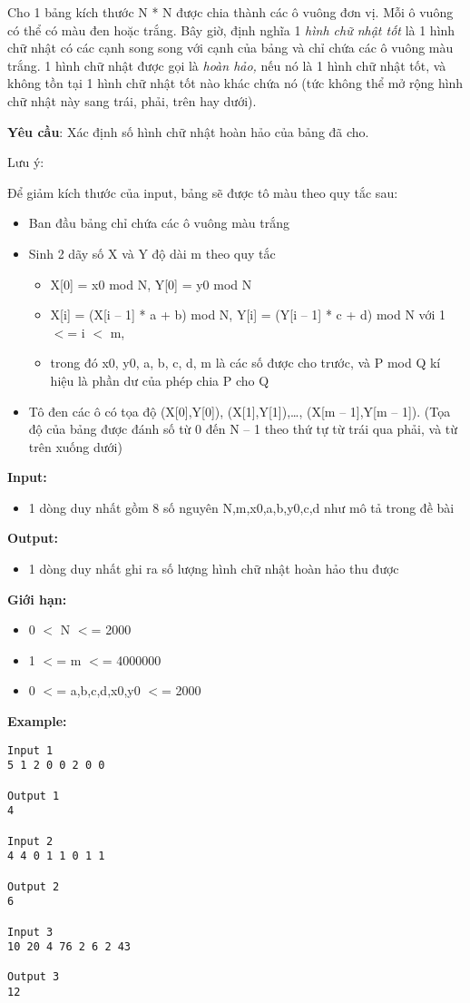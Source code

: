 

Cho 1 bảng kích thước N * N được chia thành các ô vuông đơn vị. Mỗi ô vuông có thể có màu đen hoặc trắng. Bây giờ, định nghĩa 1 \emph{ hình chữ nhật tốt } là 1 hình chữ nhật có các cạnh song song với cạnh của bảng và chỉ chứa các ô vuông màu trắng. 1 hình chữ nhật được gọi là \emph{ hoàn hảo, } nếu nó là 1 hình chữ nhật tốt, và không tồn tại 1 hình chữ nhật tốt nào khác chứa nó (tức không thể mở rộng hình chữ nhật này sang trái, phải, trên hay dưới).

\textbf{Yêu cầu}: Xác định số hình chữ nhật hoàn hảo của bảng đã cho.

Lưu ý:

Để giảm kích thước của input, bảng sẽ được tô màu theo quy tắc sau:
\begin{itemize}
	\item Ban đầu bảng chỉ chứa các ô vuông màu trắng
	\item Sinh 2 dãy số X và Y độ dài m theo quy tắc
\begin{itemize}
	\item X[0] = x0 mod N, Y[0] = y0 mod N
	\item X[i] = (X[i – 1] * a + b) mod N, Y[i] = (Y[i – 1] * c + d) mod N với 1 $<$= i $<$ m,
	\item trong đó x0, y0, a, b, c, d, m là các số được cho trước, và P mod Q kí hiệu là phần dư của phép chia P cho Q
\end{itemize}
	\item Tô đen các ô có tọa độ (X[0],Y[0]), (X[1],Y[1]),…, (X[m – 1],Y[m – 1]). (Tọa độ của bảng được đánh số từ 0 đến N – 1 theo thứ tự từ trái qua phải, và từ trên xuống dưới)
\end{itemize}

\textbf{Input:}
\begin{itemize}
	\item 1 dòng duy nhất gồm 8 số nguyên N,m,x0,a,b,y0,c,d như mô tả trong đề bài
\end{itemize}

\textbf{Output:}
\begin{itemize}
	\item 1 dòng duy nhất ghi ra số lượng hình chữ nhật hoàn hảo thu được
\end{itemize}

\textbf{Giới hạn:}
\begin{itemize}
	\item 0 $<$ N $<$= 2000
	\item 1 $<$= m $<$= 4000000
	\item 0 $<$= a,b,c,d,x0,y0 $<$= 2000
\end{itemize}

\textbf{Example:}
\begin{verbatim}
Input 1
5 1 2 0 0 2 0 0

Output 1
4

Input 2
4 4 0 1 1 0 1 1

Output 2
6

Input 3
10 20 4 76 2 6 2 43

Output 3
12\end{verbatim}